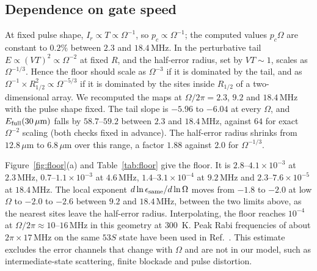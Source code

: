 \documentclass[aps,pra,twocolumn,superscriptaddress,longbibliography,floatfix]{revtex4-2}
\newcommand{\um}{\,\mu\mathrm{m}}
\newcommand{\MHz}{\,\mathrm{MHz}}
\begin{document}
\subsection{Dependence on gate speed}

At fixed pulse shape, $I_r\propto T\propto\Omega^{-1}$, so $p_c\propto\Omega^{-1}$; the computed values $p_c\Omega$ are constant to $0.2\%$ between $2.3$ and $18.4\MHz$. In the perturbative tail $E\propto(VT)^2\propto\Omega^{-2}$ at fixed $R$, and the half-error radius, set by $VT\sim1$, scales as $\Omega^{-1/3}$. Hence the floor should scale as $\Omega^{-3}$ if it is dominated by the tail, and as $\Omega^{-1}\times R_{1/2}^2\propto\Omega^{-5/3}$ if it is dominated by the sites inside $R_{1/2}$ of a two-dimensional array. We recomputed the maps at $\Omega/2\pi=2.3$, $9.2$ and $18.4\MHz$ with the pulse shape fixed. The tail slope is $-5.96$ to $-6.04$ at every $\Omega$, and $E_{\rm full}(30\um)$ falls by $58.7$--$59.2$ between $2.3$ and $18.4\MHz$, against $64$ for exact $\Omega^{-2}$ scaling (both checks fixed in advance). The half-error radius shrinks from $12.8\um$ to $6.8\um$ over this range, a factor $1.88$ against $2.0$ for $\Omega^{-1/3}$.

Figure~\ref{fig:floor}(a) and Table~\ref{tab:floor} give the floor. It is $2.8$--$4.1\times10^{-3}$ at $2.3\MHz$, $0.7$--$1.1\times10^{-3}$ at $4.6\MHz$, $1.4$--$3.1\times10^{-4}$ at $9.2\MHz$ and $2.3$--$7.6\times10^{-5}$ at $18.4\MHz$. The local exponent $d\ln\epsilon_{\rm same}/d\ln\Omega$ moves from $-1.8$ to $-2.0$ at low $\Omega$ to $-2.0$ to $-2.6$ between $9.2$ and $18.4\MHz$, between the two limits above, as the nearest sites leave the half-error radius. Interpolating, the floor reaches $10^{-4}$ at $\Omega/2\pi\approx10$--$16\MHz$ in this geometry at $300$~K. Peak Rabi frequencies of about $2\pi\times17\MHz$ on the same $53S$ state have been used in Ref.~\cite{Evered2026}. This estimate excludes the error channels that change with $\Omega$ and are not in our model, such as intermediate-state scattering, finite blockade and pulse distortion.
\end{document}
